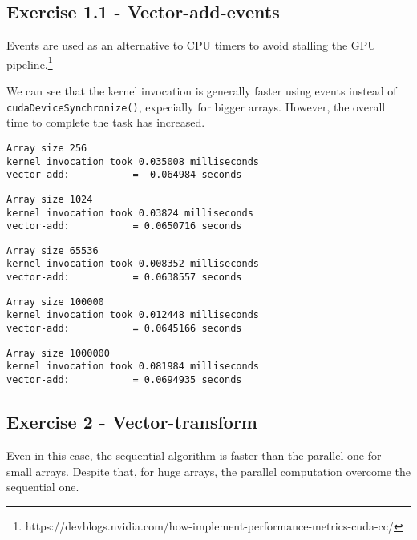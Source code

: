 \documentclass[a4paper]{article}
\begin{document}
\subsection{Exercise 1.1 - Vector-add-events}

Events are used as an alternative to CPU timers to avoid stalling the GPU pipeline.\footnote{https://devblogs.nvidia.com/how-implement-performance-metrics-cuda-cc/}

We can see that the kernel invocation is generally faster using events instead of \texttt{cudaDeviceSynchronize()}, expecially for bigger arrays. However, the overall time to complete the task has increased.

\begin{verbatim}
Array size 256
kernel invocation took 0.035008 milliseconds
vector-add: 		  =  0.064984 seconds
\end{verbatim}
\begin{verbatim}
Array size 1024
kernel invocation took 0.03824 milliseconds
vector-add: 		  = 0.0650716 seconds
\end{verbatim}
\begin{verbatim}
Array size 65536
kernel invocation took 0.008352 milliseconds
vector-add: 		  = 0.0638557 seconds
\end{verbatim}
\begin{verbatim}
Array size 100000
kernel invocation took 0.012448 milliseconds
vector-add: 		  = 0.0645166 seconds
\end{verbatim}
\begin{verbatim}
Array size 1000000
kernel invocation took 0.081984 milliseconds
vector-add: 		  = 0.0694935 seconds
\end{verbatim}

\subsection{Exercise 2 - Vector-transform}

Even in this case, the sequential algorithm is faster than the parallel one for small arrays. Despite that, for huge arrays, the parallel computation overcome the sequential one.
\end{document}
